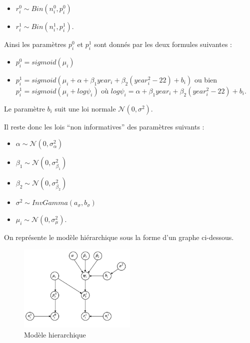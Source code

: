 \documentclass[
]{article}
\providecommand{\tightlist}{%
  \setlength{\itemsep}{0pt}\setlength{\parskip}{0pt}}
\begin{document}
\begin{itemize}
\tightlist
\item
  \(r_i^0 \sim Bin(n_i^0,p_i^0)\)
\item
  \(r_i^1 \sim Bin(n_i^1,p_i^1)\).
\end{itemize}

Ainsi les paramètres \(p_i^0\) et \(p_i^1\) sont donnés par les deux
formules suivantes :

\begin{itemize}
\tightlist
\item
  \(p_i^0 = sigmoid(\mu_i)\)
\item
  \(p_i^1 = sigmoid(\mu_i+\alpha+\beta_1 year_i+\beta_2(year_i^2-22)+b_i)\)
  ou bien \(p_i^1 = sigmoid(\mu_i+log\psi_i)\) où
  \(log\psi_i = \alpha+\beta_1 year_i+\beta_2(year_i^2-22)+b_i\).
\end{itemize}

Le paramètre \(b_i\) suit une loi normale \(\mathcal N(0,\sigma^2)\).

Il reste donc les lois ``non informatives'' des paramètres suivants :

\begin{itemize}
\tightlist
\item
  \(\alpha \sim\mathcal N(0,\sigma_{\alpha}^2)\)
\item
  \(\beta_1 \sim\mathcal N(0,\sigma_{\beta_1}^2)\)
\item
  \(\beta_2 \sim\mathcal N(0,\sigma_{\beta_2}^2)\)
\item
  \(\sigma^2 \sim InvGamma(a_{\sigma},b_{\sigma})\)
\item
  \(\mu_i \sim\mathcal N(0,\sigma_{\mu}^2)\).
\end{itemize}

On représente le modèle hiérarchique sous la forme d'un graphe
ci-dessous.

\begin{figure}
\centering
\includegraphics[width=0.5\textwidth,height=\textheight]{Model.jpg}
\caption{Modèle hierarchique}
\end{figure}
\end{document}
